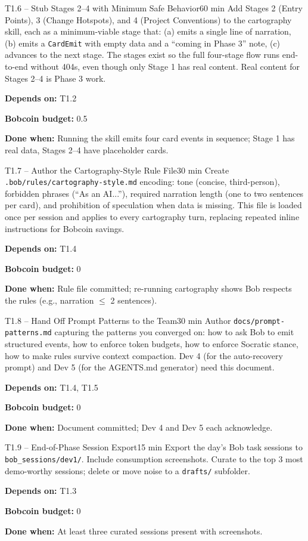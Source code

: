\documentclass[11pt,letterpaper]{article}
\newcommand{\acceptance}[1]{\par\smallskip\textcolor{ibmgreen}{\textbf{Done when:}} #1}
\newcommand{\depends}[1]{\par\smallskip\textcolor{ibmorange}{\textbf{Depends on:}} #1}
\newcommand{\bobcost}[1]{\par\smallskip\textcolor{ibmaccent}{\textbf{Bobcoin budget:}} #1}
\begin{document}
\begin{task}{T1.6 -- Stub Stages 2--4 with Minimum Safe Behavior}{60 min}
Add Stages 2 (Entry Points), 3 (Change Hotspots), and 4 (Project Conventions) to the cartography skill, each as a minimum-viable stage that: (a) emits a single line of narration, (b) emits a \texttt{CardEmit} with empty data and a ``coming in Phase 3'' note, (c) advances to the next stage. The stages exist so the full four-stage flow runs end-to-end without 404s, even though only Stage 1 has real content. Real content for Stages 2--4 is Phase 3 work.
\depends{T1.2}
\bobcost{0.5}
\acceptance{Running the skill emits four card events in sequence; Stage 1 has real data, Stages 2--4 have placeholder cards.}
\end{task}

\begin{task}{T1.7 -- Author the Cartography-Style Rule File}{30 min}
Create \texttt{.bob/rules/cartography-style.md} encoding: tone (concise, third-person), forbidden phrases (``As an AI...''), required narration length (one to two sentences per card), and prohibition of speculation when data is missing. This file is loaded once per session and applies to every cartography turn, replacing repeated inline instructions for Bobcoin savings.
\depends{T1.4}
\bobcost{0}
\acceptance{Rule file committed; re-running cartography shows Bob respects the rules (e.g., narration $\leq$ 2 sentences).}
\end{task}

\begin{task}{T1.8 -- Hand Off Prompt Patterns to the Team}{30 min}
Author \texttt{docs/prompt-patterns.md} capturing the patterns you converged on: how to ask Bob to emit structured events, how to enforce token budgets, how to enforce Socratic stance, how to make rules survive context compaction. Dev 4 (for the auto-recovery prompt) and Dev 5 (for the AGENTS.md generator) need this document.
\depends{T1.4, T1.5}
\bobcost{0}
\acceptance{Document committed; Dev 4 and Dev 5 each acknowledge.}
\end{task}

\begin{task}{T1.9 -- End-of-Phase Session Export}{15 min}
Export the day's Bob task sessions to \texttt{bob\_sessions/dev1/}. Include consumption screenshots. Curate to the top 3 most demo-worthy sessions; delete or move noise to a \texttt{drafts/} subfolder.
\depends{T1.3}
\bobcost{0}
\acceptance{At least three curated sessions present with screenshots.}
\end{task}
\end{document}
